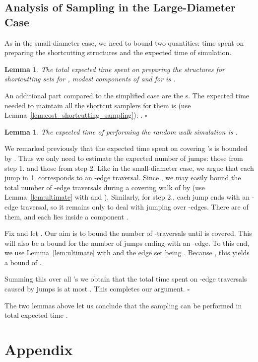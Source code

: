 \documentclass[11pt, letterpaper]{article}
\newtheorem{lemma}[theorem]{Lemma}
\newenvironment{proof}{\noindent{\bf Proof:}\hspace*{1em}}{\qed\bigskip}
\newcommand{\qed}{\hfill\ensuremath{\square}}
\begin{document}
\subsection{Analysis of Sampling in the Large-Diameter Case}
As in the small-diameter case, we need to bound two quantities: time spent on preparing the shortcutting structures and the expected time of simulation.
\begin{lemma}\label{lem:preparation_cost_general}
The total expected time spent on preparing the structures for shortcutting sets  for , modest components of  and  for  is .
\end{lemma}
\begin{proof}
An additional part compared to the simplified case are the s. The expected time needed to maintain all the shortcut samplers for them is (use Lemma~\ref{lem:cost_shortcutting_sampling}): .
\end{proof}

\begin{lemma}\label{lem:walking_cost_general}
The expected time of performing the random walk simulation is .
\end{lemma}
\begin{proof}
We remarked previously that the expected time spent on covering 's is bounded by . Thus we only need to estimate the expected number of jumps: those from step 1. and those from step 2. Like in the small-diameter case, we argue that each jump in 1. corresponds to an -edge traversal. Since , we may easily bound the total number of -edge traversals during a covering walk of  by  (use Lemma~\ref{lem:ultimate} with  and ). Similarly, for step 2., each jump ends with an -edge traversal, so it remains only to deal with jumping over -edges. There are  of them, and each lies inside a component .

Fix  and let . Our aim is to bound the number of -traversals until  is covered. This will also be a bound for the number of jumps ending with an -edge. To this end, we use Lemma~\ref{lem:ultimate} with  and the edge set being . Because , this yields a bound of .

Summing this over all 's we obtain that the total time spent on -edge traversals caused by jumps is at most . This completes our argument. 
\end{proof}

The two lemmas above let us conclude that the sampling can be performed in total expected time . 

\appendix
\section{Appendix}
\end{document}
